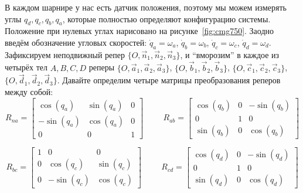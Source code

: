 \documentclass{article}
\begin{document}
В каждом шарнире у нас есть датчик положения, поэтому мы можем измерять углы $q_d, q_c, q_b, q_a$, которые полностью определяют конфигурацию системы.
Положение при нулевых углах нарисовано на рисунке~\ref{fig:cmg750}.
Заодно введём обозначение угловых скоростей: $\dot{q}_a = \omega_a$,  $\dot{q}_b = \omega_b$,  $\dot{q}_c = \omega_c$,  $\dot{q}_d = \omega_d$.
Зафиксируем неподвижный репер $\{O, \vec{n}_1, \vec{n}_2, \vec{n}_3\}$, и ``вморозим'' в каждое из четырёх тел $A,B,C,D$ реперы
$\{O, \vec{a}_1, \vec{a}_2, \vec{a}_3\}$,
$\{O, \vec{b}_1, \vec{b}_2, \vec{b}_3\}$,
$\{O, \vec{c}_1, \vec{c}_2, \vec{c}_3\}$,
$\{O, \vec{d}_1, \vec{d}_2, \vec{d}_3\}$.
Давайте определим четыре матрицы преобразования реперов между собой:
$$
R_{na} = \begin{bmatrix}
 \cos(q_a) & \sin(q_a) & 0\\
-\sin(q_a) & \cos(q_a) & 0\\
0         & 0        & 1
\end{bmatrix}
\hspace{1cm}
R_{ab} = \begin{bmatrix}
\cos(q_b) & 0 & -\sin(q_b)\\
0         & 1 &  0        \\
\sin(q_b) & 0 &  \cos(q_b)
\end{bmatrix}
$$

$$
R_{bc} = \begin{bmatrix}
1 &  0         & 0        \\
0 &  \cos(q_c) & \sin(q_c)\\
0 & -\sin(q_c) & \cos(q_c)
\end{bmatrix}
\hspace{1cm}
R_{cd} = \begin{bmatrix}
\cos(q_d) & 0 & -\sin(q_d)\\
0         & 1 &  0        \\
\sin(q_d) & 0 &  \cos(q_d)
\end{bmatrix}
$$
\end{document}
